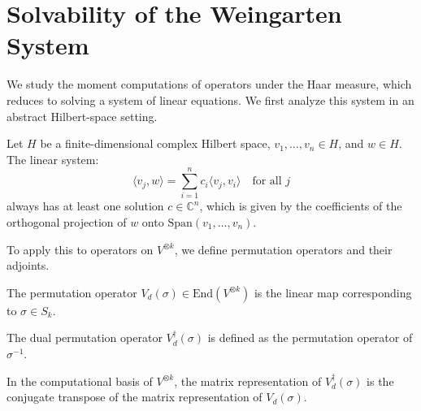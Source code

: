 \section{Solvability of the Weingarten System}

We study the moment computations of operators under the Haar measure, which reduces to solving a system of linear equations. We first analyze this system in an abstract Hilbert-space setting.

\begin{theorem}\label{thm:gram_system_solvable}
  \leanok
  Let $H$ be a finite-dimensional complex Hilbert space, $v_1, \dots, v_n \in H$, and $w \in H$. The linear system:
  \begin{equation}
    \langle v_j, w \rangle = \sum_{i=1}^n c_i \langle v_j, v_i \rangle \quad \text{for all } j
  \end{equation}
  always has at least one solution $c \in \mathbb{C}^n$, which is given by the coefficients of the orthogonal projection of $w$ onto $\text{Span}(v_1, \dots, v_n)$.
\end{theorem}

To apply this to operators on $V^{\otimes k}$, we define permutation operators and their adjoints.

\begin{definition}\label{def:permOp}
  \leanok
  The permutation operator $V_d(\sigma) \in \text{End}(V^{\otimes k})$ is the linear map corresponding to $\sigma \in S_k$.
\end{definition}

\begin{definition}\label{def:permDual}
  \leanok
  The dual permutation operator $V_d^\dagger(\sigma)$ is defined as the permutation operator of $\sigma^{-1}$.
\end{definition}

\begin{theorem}\label{thm:permDual_eq_conjTranspose}
  \leanok
  In the computational basis of $V^{\otimes k}$, the matrix representation of $V_d^\dagger(\sigma)$ is the conjugate transpose of the matrix representation of $V_d(\sigma)$.
\end{theorem}

